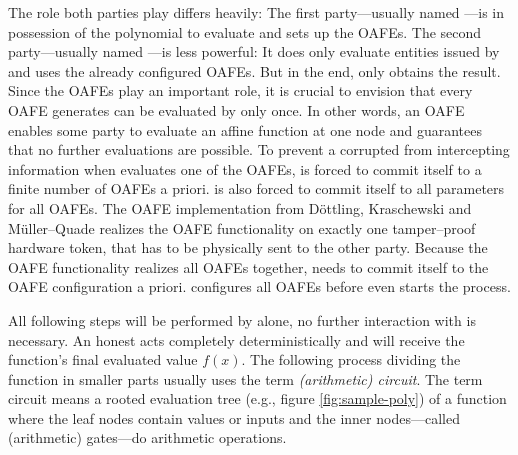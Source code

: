The role both parties play differs heavily: The first party---usually named
\JWpOne{}---is in possession of the polynomial to evaluate and sets up the
OAFEs.  The second party---usually named \JWpTwo{}---is less powerful: It does
only evaluate entities issued by \JWpOne{} and uses the already configured
OAFEs. But in the end, only \JWpTwo{} obtains the result.  Since the OAFEs play
an important role, it is crucial to envision that every OAFE \JWpOne{} generates
can be evaluated by \JWpTwo{} only once. In other words, an OAFE enables some
party to evaluate an affine function at one node and guarantees that no further
evaluations are possible. To prevent a corrupted \JWpOne{} from intercepting
information when \JWpTwo{} evaluates one of the OAFEs, \JWpOne{} is forced to
commit itself to a finite number of OAFEs a priori. \JWpOne{} is also forced to
commit itself to all parameters for all OAFEs. The OAFE implementation from
Döttling, Kraschewski and Müller--Quade\cite{davidgoliath} realizes the OAFE
functionality on exactly one tamper--proof hardware token, that has to be
physically sent to the other party. Because the OAFE functionality realizes all
OAFEs together, \JWpOne{} needs to commit itself to the OAFE configuration a
priori. \JWpOne{} configures all OAFEs before \JWpTwo{} even starts the process.

All following steps will be performed by \JWpTwo{} alone, no further interaction
with \JWpOne{} is necessary. An honest \JWpTwo{} acts completely
deterministically and will receive the function's final evaluated value $f(x)$.
The following process dividing the function in smaller parts usually uses the
term \emph{(arithmetic) circuit}. The term circuit means a rooted evaluation
tree (e.g., figure \ref{fig:sample-poly}) of a function where the leaf nodes
contain values or inputs and the inner nodes---called (arithmetic) gates---do
arithmetic operations.

